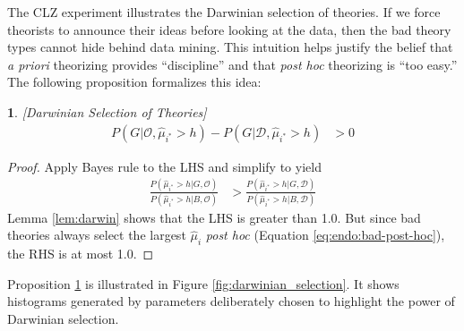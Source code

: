 \documentclass[12pt,english]{article}
\theoremstyle{plain}
\theoremstyle{plain}
\newtheorem{prop}[thm]{\protect\propositionname}
\providecommand{\propositionname}{Proposition}
\providecommand{\propositionname}{Proposition}
\begin{document}
The CLZ experiment illustrates the Darwinian selection of theories. If we force theorists to announce their ideas before looking at the data, then the bad theory types cannot hide  behind data mining.  This intuition helps justify the belief that \emph{a priori} theorizing provides ``discipline'' and that \emph{post hoc} theorizing is ``too easy.''  The following proposition formalizes this idea:
\begin{prop}\label{prop:darwin}
{[}Darwinian Selection of Theories{]} 
\begin{align*}
P\left(G|\mathcal{O},\hat{\mu}_{i^{\ast}}>h\right)-P\left(G|\mathcal{\mathcal{D}},\hat{\mu}_{i^{\ast}}>h\right) & >0
\end{align*}
\end{prop}

\begin{proof}
Apply Bayes rule to the LHS and simplify to yield
\begin{align*}
\frac{P\left(\hat{\mu}_{i^{\ast}}>h|G,\mathcal{O}\right)}{P\left(\hat{\mu}_{i^{\ast}}>h|B,\mathcal{O}\right)} & >\frac{P\left(\hat{\mu}_{i^{\ast}}>h|G,\mathcal{\mathcal{D}}\right)}{P\left(\hat{\mu}_{i^{\ast}}>h|B,\mathcal{\mathcal{D}}\right)}
\end{align*}
Lemma \ref{lem:darwin} shows that the LHS is greater than 1.0. But since bad theories always select the largest
$\hat{\mu}_{i}$ \emph{post hoc} (Equation \eqref{eq:endo:bad-post-hoc}), the RHS is at most 1.0. 
\end{proof}

Proposition \ref{prop:darwin} is illustrated in Figure \ref{fig:darwinian_selection}. It shows histograms generated by parameters deliberately chosen to highlight the power of Darwinian selection. 
\end{document}
